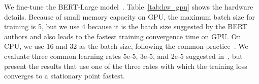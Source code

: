 


We %
\textcolor{jie}{fine-tune} the BERT-Large model~\cite{devlin2018bert}.  Table~\ref{tab:hw_gpu} shows the hardware details. 
Because of small memory capacity on GPU, the maximum batch size for training is 5, but \textcolor{dong2}{we use 4 because it \textcolor{dong2}{is the batch size suggested by the BERT authors and also leads to the fastest training convergence time on GPU}}. On CPU, we use 16 and 32 as the batch size, following the common practice~\cite{devlin2018bert}. We evaluate three common learning rates 5e-5, 3e-5, and 2e-5 suggested in~\cite{devlin2018bert}, but present the results that use one of the three rates %
\textcolor{dong2}{with which the training loss converges to a stationary point fastest.}

